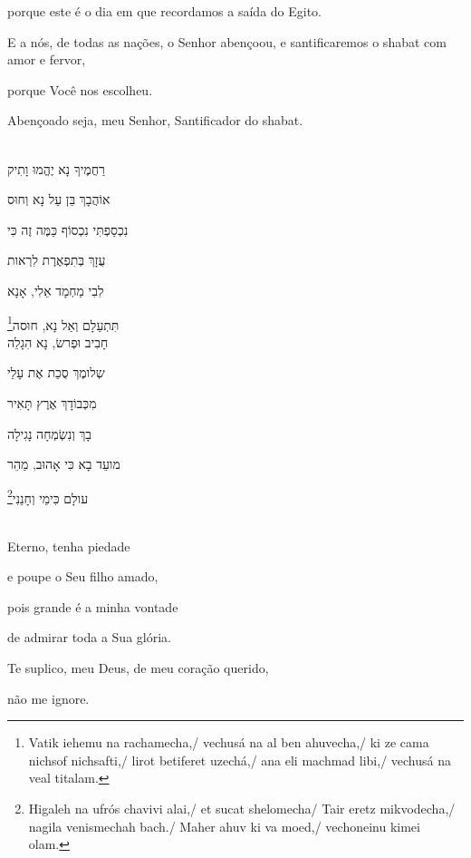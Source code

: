 porque este é o dia em que recordamos a saída do Egito.

E a nós, de todas as nações, o Senhor abençoou, e \qb{}santificaremos o
shabat com amor e fervor,

porque Você nos escolheu.

Abençoado seja, meu Senhor, Santificador do shabat.


\movetoevenpage
\raggedleft

\vspace*{1cm}

\textsc{}\\[15pt]

רַחֲמֶיךָ נָא יֶהֱמוּ וָתִיק \label{ref02}

אוֹהֲבָךְ בֵּן עַל נָא וְחוּס 

נִכְסַפְתִּי נִכְסוֹף כַּמֶּה זֶה כִּי 

עֻזָךְ בְּתִפְאֶרֶת לִרְאות 

לִבִי מַחְמָד אֵלִי, אָנָא 

\footnote{Vatik iehemu na rachamecha,/
vechusá na al ben ahuvecha,/ ki ze cama nichsof nichsafti,/ lirot betiferet uzechá,/
ana eli machmad libi,/ vechusá na veal titalam.}תִּתְעַלָם וְאַל נָא, חוּסה\\[10pt]

חָבִיב וּפְרשׂ, נָא הִגָלֵה

שְלומֶךְ סֻכַת אֶת עָלַי 

מִכְּבוֹדָךְ אֶרֶץ תָּאִיר 

בָךְ וְנִשְׂמְחָה נָגִילָה 

מועֵד בָא כִּי אָהוּב, מַהֵר

\footnote{
Higaleh na ufrós chavivi alai,/
et sucat shelomecha/ Tair eretz mikvodecha,/ nagila venismechah bach./ Maher ahuv ki va moed,/
vechoneinu kimei olam.}עולָם כִּימֵי וְחָנֵנִי

\movetooddpage
\raggedright

\vspace*{1cm}

\textsc{}\\[15pt]

Eterno, tenha piedade

e poupe o Seu filho amado,

pois grande é a minha vontade

de admirar toda a Sua glória.

Te suplico, meu Deus, de meu coração querido,

não me ignore.\\[10pt]

